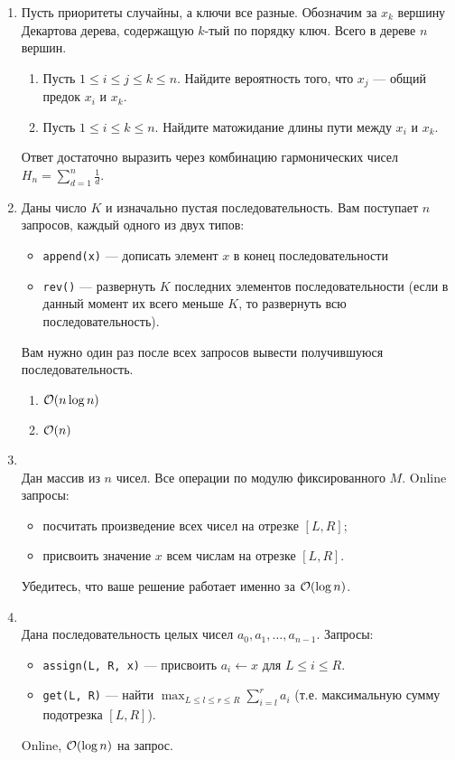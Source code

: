 \begin{enumerate}
  \item
    Пусть приоритеты случайны, а ключи все разные. Обозначим за $x_k$ вершину Декартова дерева,
    содержащую $k$-тый по порядку ключ. Всего в дереве $n$ вершин.
    \begin{enumerate}
      \item Пусть $1 \le i \le j \le k \le n$. Найдите вероятность того, что $x_j$ --- общий предок $x_i$ и $x_k$.
      \item Пусть $1 \le i \le k \le n$. Найдите матожидание длины пути между $x_i$ и $x_k$.
    \end{enumerate}
    Ответ достаточно выразить через комбинацию гармонических чисел $H_n = \sum\limits_{d = 1}^{n}\frac{1}{d}$.

  \item
    Даны число $K$ и изначально пустая последовательность. Вам поступает $n$ запросов, каждый одного из двух типов:
    \begin{itemize}
      \item \texttt{append(x)} --- дописать элемент $x$ в конец последовательности
      \item \texttt{rev()} ---
        развернуть $K$ последних элементов последовательности (если в данный момент их всего меньше $K$, то
        развернуть всю последовательность).
    \end{itemize}
    Вам нужно один раз после всех запросов вывести получившуюся последовательность.
    \begin{enumerate}
      \item $\mathcal{O}(n \log{n})$
      \item $\mathcal{O}(n)$
    \end{enumerate}

  \item {}\\
    Дан массив из $n$ чисел. Все операции по модулю фиксированного $M$. Online запросы:
	\begin{itemize}
		\item посчитать произведение всех чисел на отрезке $[L, R]$;
		\item присвоить значение $x$ всем числам на отрезке $[L, R]$.
	\end{itemize}
	Убедитесь, что ваше решение работает именно за $\mathcal{O}(\log n)$.

  \item {}\\
    Дана последовательность целых чисел $a_0, a_1, \dots, a_{n-1}$. Запросы:
    \begin{itemize}
      \item \texttt{assign(L, R, x)} --- присвоить $a_i \leftarrow x$ для $L \le i \le R$.
      \item
        \texttt{get(L, R)} --- найти $\max_{L \le l \le r \le R} \sum_{i=l}^r a_i$
        (т.е. максимальную сумму подотрезка $[L, R]$).
    \end{itemize}
    Online, $\mathcal{O}(\log{n})$ на запрос.


\end{enumerate}

